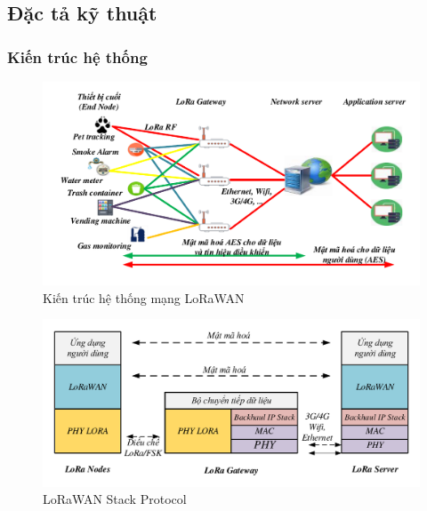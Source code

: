 \subsection{Đặc tả kỹ thuật}

\subsubsection{Kiến trúc hệ thống}
	\begin{figure}[h!] %
			\centering
			\includegraphics[width=1\linewidth]{./img/27.pdf}
			\caption{Kiến trúc hệ thống mạng LoRaWAN}
			\label{fig:fig27}
	\end{figure}
	\begin{figure}[h!] %
			\centering
			\includegraphics[width=1\linewidth]{./img/28.pdf}
			\caption{LoRaWAN Stack Protocol}
			\label{fig:fig28}
	\end{figure}	
	
